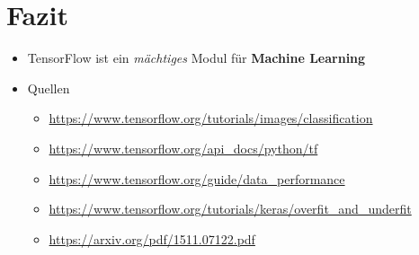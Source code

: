 \documentclass[t]{beamer}
\begin{document}
\section{Fazit}
\begin{frame}
    \begin{itemize}
        \item TensorFlow ist ein \emph{mächtiges} Modul für \textbf{Machine Learning}
        \newline
        \item Quellen
        \begin{itemize}
            \item \href{https://www.tensorflow.org/tutorials/images/classification}{https://www.tensorflow.org/tutorials/images/classification}
            \item \href{https://www.tensorflow.org/api\_docs/python/tf}{https://www.tensorflow.org/api\_docs/python/tf}
            \item \href{https://www.tensorflow.org/guide/data\_performance}{https://www.tensorflow.org/guide/data\_performance}
            \item \href{https://www.tensorflow.org/tutorials/keras/overfit\_and\_underfit}{https://www.tensorflow.org/tutorials/keras/overfit\_and\_underfit}
            \item \href{https://arxiv.org/pdf/1511.07122.pdf}{https://arxiv.org/pdf/1511.07122.pdf}
        \end{itemize}
    \end{itemize}
\end{frame}
\end{document}
